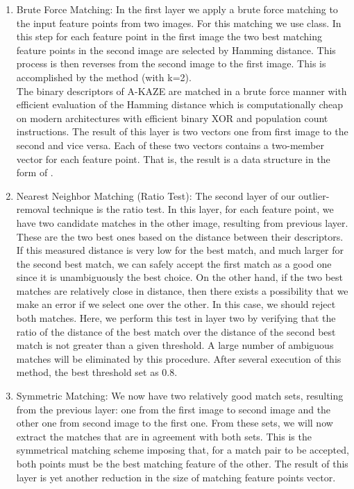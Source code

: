 \begin {enumerate}
  \item Brute Force Matching: In the first layer we apply a brute force matching to the input feature points from two images. For this matching we use  class. In this step for each feature point in the first image the two best matching feature points in the second image are selected by Hamming distance. This process is then reverses from the second image to the first image. This is accomplished by the  method (with k=2).\\
  The binary descriptors of A-KAZE are matched in a brute force manner with efficient evaluation of the Hamming distance which is computationally cheap on modern architectures with efficient binary XOR and population count instructions.
  The result of this layer is two vectors one from first image to the second and vice versa. Each of these two vectors contains a two-member vector for each feature point. That is, the result is a data structure in the form of . 
  \item Nearest Neighbor Matching (Ratio Test): The second layer of our outlier-removal technique is the ratio test. In this layer, for each feature point, we have two candidate matches in the other image, resulting from previous layer. These are the two best ones based on the distance between their descriptors. If this measured distance is very low for the best match, and much larger for the second best match, we can safely accept the first match as a good one since it is unambiguously the best choice. On the other hand, if the two best matches are relatively close in distance, then there exists a possibility that we make an error if we select one over the other. In this case, we should reject both matches. Here, we perform this test in layer two by verifying that the ratio of the distance of the best match over the distance of the second best match is not greater than a given threshold. A large number of ambiguous matches will be eliminated by this procedure. After several execution of this method, the best threshold set as 0.8.
  \item Symmetric Matching: We now have two relatively good match sets, resulting from the previous layer: one from the first image to second image and the other one from second image to the first one. From these sets, we will now extract the matches that are in agreement with both sets. This is the symmetrical matching scheme imposing that, for a match pair to be accepted, both points must be the best matching feature of the other. The result of this layer is yet another reduction in the size of matching feature points vector.

\end{enumerate}
